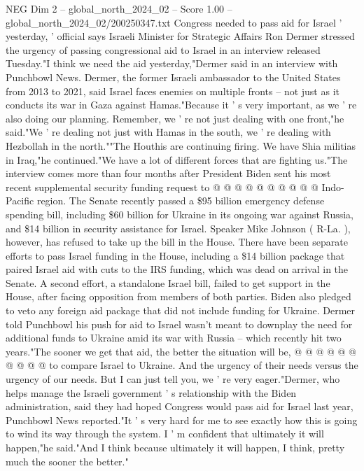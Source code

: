 \begin{textsample}{NEG Dim 2 – global\_north\_2024\_02 – Score 1.00 – global\_north\_2024\_02/200250347.txt}  \label{ex:f2_neg_308}
Congress needed to pass aid for Israel ' yesterday, ' official says Israeli Minister for Strategic Affairs Ron Dermer stressed the urgency of passing congressional aid to Israel in an interview released Tuesday."I think we need the aid yesterday,"Dermer said in an interview with Punchbowl News.
Dermer, the former Israeli ambassador to the United States from 2013 to 2021, said Israel faces enemies on multiple fronts -- not just as it conducts its war in Gaza against Hamas."Because it ' s very important, as we ' re also doing our planning.
Remember, we ' re not just dealing with one front,"he said."We ' re dealing not just with Hamas in the south, we ' re dealing with Hezbollah in the north.""The Houthis are continuing firing.
We have Shia militias in Iraq,"he continued."We have a lot of different forces that are fighting us."The interview comes more than four months after President Biden sent his most recent supplemental security funding request to @ @ @ @ @ @ @ @ @ @ Indo-Pacific region.
The Senate recently passed a \$95 billion emergency defense spending bill, including \$60 billion for Ukraine in its ongoing war against Russia, and \$14 billion in security assistance for Israel.
Speaker Mike Johnson ( R-La. ), however, has refused to take up the bill in the House.
There have been separate efforts to pass Israel funding in the House, including a \$14 billion package that paired Israel aid with cuts to the IRS funding, which was dead on arrival in the Senate.
A second effort, a standalone Israel bill, failed to get support in the House, after facing opposition from members of both parties.
Biden also pledged to veto any foreign aid package that did not include funding for Ukraine.
Dermer told Punchbowl his push for aid to Israel wasn't meant to downplay the need for additional funds to Ukraine amid its war with Russia -- which recently hit two years."The sooner we get that aid, the better the situation will be, @ @ @ @ @ @ @ @ @ @ to compare Israel to Ukraine.
And the urgency of their needs versus the urgency of our needs.
But I can just tell you, we ' re very eager."Dermer, who helps manage the Israeli government ' s relationship with the Biden administration, said they had hoped Congress would pass aid for Israel last year, Punchbowl News reported."It ' s very hard for me to see exactly how this is going to wind its way through the system.
I ' m confident that ultimately it will happen,"he said."And I think because ultimately it will happen, I think, pretty much the sooner the better."

\end{textsample}
